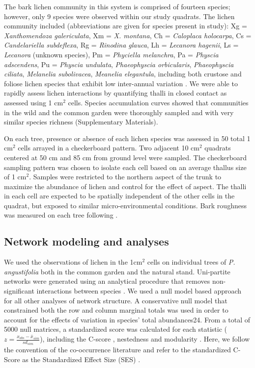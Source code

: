 \documentclass[fleqn,10pt]{wlscirep}
\begin{document}
The bark lichen community in this system is comprised of fourteen
species; however, only 9 species were observed within our study
quadrats. The lichen community included (abbreviations are given for
species present in study): Xg = \textit{Xanthomendoza galericulata},
Xm = \textit{X. montana}, Ch = \textit{Caloplaca holocarpa}, Cs =
\textit{Candelariella subdeflexa}, Rg = \textit{Rinodina glauca}, Lh =
\textit{Lecanora hagenii}, Ls = \textit{Lecanora} (unknown species),
Pm = \textit{Phyciella melanchra}, Pa = \textit{Physcia adscendens},
Pu = \textit{Physcia undulata}, \textit{Phaeophyscia orbicularis},
\textit{Phaeophyscia ciliata}, \textit{Melanelia subolivacea},
\textit{Meanelia elegantula}, including both crustose and foliose
lichen species that exhibit low inter-annual variation
\cite{Ellison2005}. We were able to rapidly assess lichen interactions
by quantifying thalli in closed contact as assessed using 1 cm$^2$
cells. Species accumulation curves showed that communities in the wild
and the common garden were thoroughly sampled and with very similar
species richness (Supplementary Materials). 

On each tree, presence or absence of each lichen species was assessed
in 50 total 1 cm$^2$ cells arrayed in a checkerboard pattern. Two
adjacent 10 cm$^2$ quadrats centered at 50 cm and 85 cm from ground
level were sampled. The checkerboard sampling pattern was chosen to
isolate each cell based on an average thallus size of 1
cm$^2$. Samples were restricted to the northern aspect of the trunk to
maximize the abundance of lichen and control for the effect of
aspect. The thalli in each cell are expected to be spatially
independent of the other cells in the quadrat, but exposed to similar
micro-environmental conditions. Bark roughness was measured on each
tree following \cite{Winfree2011}.

\subsection*{Network modeling and analyses}

We used the observations of lichen in the 1cm$^2$ cells on individual
trees of \textit{P. angustifolia} both in the common garden and the
natural stand. Uni-partite networks were generated using an analytical
procedure that removes non-significant interactions between species
\cite{Araujo2011}. We used a null model based approach for all other
analyses of network structure. A conservative null model that
constrained both the row and column marginal totals was used in order
to account for the effects of variation in species’ total
abundances24. From a total of 5000 null matrices, a standardized score
was calculated for each statistic ($z = \frac{x_{obs} -
  \bar{x}_{sim}}{sd_{sim}}$), including the C-score \cite{Stone1990a},
nestedness \cite{Atmar1993} and modularity \cite{Newman2006}. Here, we
follow the convention of the co-occurrence literature and refer to the
standardized C-Score as the Standardized Effect Size (SES)
\cite{Gotelli2001}.
\end{document}
